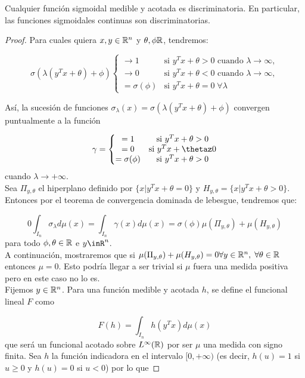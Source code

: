 \begin{itemize}
\begin{lema}\label{thm:lema-discriminatoria-sigmoidal}
Cualquier función sigmoidal medible y acotada es discriminatoria. En particular, las funciones sigmoidales continuas son discriminatorias.
\end{lema}
\begin{proof}
Para cuales quiera $x,y\in\mathbb{R}^n$ y $\theta,\phi\mathbb{R}$, tendremos:

$$\sigma(\lambda(y^Tx+\theta)+\phi) \left \{ \begin{matrix}
\to 1 & \mbox{si } y^Tx+\theta>0 \mbox{ cuando } \lambda \to \infty, \\
\to 0 & \mbox{si } y^Tx+\theta<0 \mbox{ cuando } \lambda \to \infty, \\
= \sigma(\phi) & \mbox{si } y^Tx +\theta = 0 \; \forall \lambda
\end{matrix}\right.$$

Así, la sucesión de funciones $\sigma_\lambda(x)=\sigma(\lambda(y^Tx+\theta)+\phi)$ convergen puntualmente a la función

$$\gamma=\left\{ \begin{matrix}
=1 & \mbox{si } y^Tx+\theta>0 \\
=0 & \mbox{si } y^Tx+\thetaz0 \\
=\sigma(\phi) & \mbox{si } y^Tx+\theta>0
\end{matrix}\right.$$
cuando $\lambda\to+\infty$.\\

Sea $\Pi_{y,\theta}$ el hiperplano definido por $\{x | y^Tx+\theta =0\}$ y $H_{y,\theta}=\{x | y^Tx+\theta>0\}.$ Entonces por el teorema de convergencia dominada de lebesgue, tendremos que:

$$0\int_{I_n}\sigma_\lambda d\mu(x)=\int_{I_n}\gamma(x)d\mu(x)=\sigma(\phi)\mu(\Pi_{y,\theta})+\mu(H_{y,\theta})$$
para todo $\phi,\theta\in\mathbb{R}$ e $y\inR^n$.\\

A continuación, mostraremos que si $\mu(\Pi_{y,\theta})+\mu(H_{y,\theta})=0 \forall y \in \mathbb{R}^n, \; \forall \theta \in \mathbb{R}$ entonces $\mu=0$. Esto podría llegar a ser trivial si $\mu$ fuera una medida positiva pero en este caso no lo es.\\

Fijemos $y\in\mathbb{R}^n$. Para una función medible y acotada $h$, se define el funcional lineal $F$ como

$$F(h)=\int_{I_n}h(y^Tx)d\mu(x)$$
que será un funcional acotado sobre $L^\infty(\mathbb{R})$ por ser $\mu$ una medida con signo finita. Sea $h$ la función indicadora en el intervalo $[0,+\infty)$ (es decir, $h(u)=1$ si $u\ge 0$ y $h(u)=0$ si $u<0$) por lo que


\end{proof}
\end{itemize}
